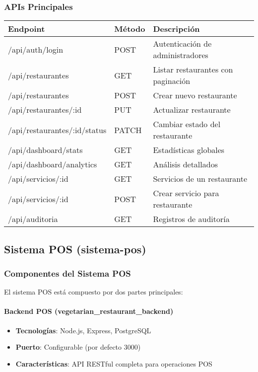 \documentclass[12pt,a4paper]{article}
\begin{document}
\subsubsection{APIs Principales}
\begin{longtable}{|p{3cm}|p{2cm}|p{8cm}|}
\hline
\textbf{Endpoint} & \textbf{Método} & \textbf{Descripción} \\
\hline
\endhead
/api/auth/login & POST & Autenticación de administradores \\
\hline
/api/restaurantes & GET & Listar restaurantes con paginación \\
\hline
/api/restaurantes & POST & Crear nuevo restaurante \\
\hline
/api/restaurantes/:id & PUT & Actualizar restaurante \\
\hline
/api/restaurantes/:id/status & PATCH & Cambiar estado del restaurante \\
\hline
/api/dashboard/stats & GET & Estadísticas globales \\
\hline
/api/dashboard/analytics & GET & Análisis detallados \\
\hline
/api/servicios/:id & GET & Servicios de un restaurante \\
\hline
/api/servicios/:id & POST & Crear servicio para restaurante \\
\hline
/api/auditoria & GET & Registros de auditoría \\
\hline
\end{longtable}

\subsection{Sistema POS (sistema-pos)}

\subsubsection{Componentes del Sistema POS}
El sistema POS está compuesto por dos partes principales:

\paragraph{Backend POS (vegetarian\_restaurant\_backend)}
\begin{itemize}
    \item \textbf{Tecnologías}: Node.js, Express, PostgreSQL
    \item \textbf{Puerto}: Configurable (por defecto 3000)
    \item \textbf{Características}: API RESTful completa para operaciones POS
\end{itemize}
\end{document}
